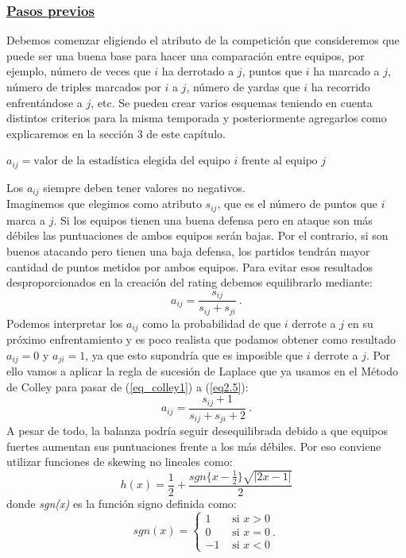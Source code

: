 \subsubsection*{\underline{Pasos previos}}
Debemos comenzar eligiendo el atributo de la competición que consideremos que puede ser una buena base para hacer una comparación entre equipos, por ejemplo, número de veces que $i$ ha derrotado a $j$, puntos que $i$ ha marcado a $j$, número de triples marcados por $i$ a $j$, número de yardas que $i$ ha recorrido enfrentándose a $j$, etc. Se pueden crear varios esquemas teniendo en cuenta distintos criterios para la misma temporada y posteriormente agregarlos como explicaremos en la sección 3 de este capítulo.
\begin{center}
	$a_{ij} = \text{valor de la estadística elegida del equipo }i \text{ frente al equipo } j$
\end{center}
Los $a_{ij}$ siempre deben tener valores no negativos.\\

Imaginemos que elegimos como atributo $s_{ij}$, que es el número de puntos que $i$ marca a $j$. Si los equipos tienen una buena defensa pero en ataque son más débiles las puntuaciones de ambos equipos serán bajas. Por el contrario, si son buenos atacando pero tienen una baja defensa, los partidos tendrán mayor cantidad de puntos metidos por ambos equipos. Para evitar esos resultados desproporcionados en la creación del rating debemos equilibrarlo mediante:
\begin{equation}
a_{ij} = \dfrac{s_{ij}}{s_{ij}+s_{ji}} \ . 
\end{equation}
Podemos interpretar los $a_{ij}$ como la probabilidad de que $i$ derrote a $j$ en su próximo enfrentamiento y es poco realista que podamos obtener como resultado $a_{ij}=0$ y $a_{ji}=1$, ya que esto supondría que es imposible que $i$ derrote a $j$. Por ello vamos a aplicar la regla de sucesión de Laplace que ya usamos en el Método de Colley para pasar de (\ref{eq_colley1}) a (\ref{eq2.5}):
\begin{equation}
a_{ij} = \dfrac{s_{ij}+1}{s_{ij}+s_{ji}+2} \ . \label{formejem6}
\end{equation}
A pesar de todo, la balanza podría seguir desequilibrada debido a que equipos fuertes aumentan sus puntuaciones frente a los más débiles. Por eso conviene utilizar funciones de skewing no lineales \cite[págs 31-32]{libro_rankings} como:
\begin{equation}
h(x) = \frac{1}{2} + \dfrac{sgn\{x-\frac{1}{2}\} \sqrt{|2x-1|}}{2} 
\end{equation} 
donde \textit{sgn(x)} es la función signo definida como:
\begin{equation*}
sgn(x) = \begin{cases}
1 & \text{ si } x>0\\
0 & \text{ si } x=0 \ .\\ 
-1 & \text{ si } x<0 
\end{cases}
\end{equation*}


